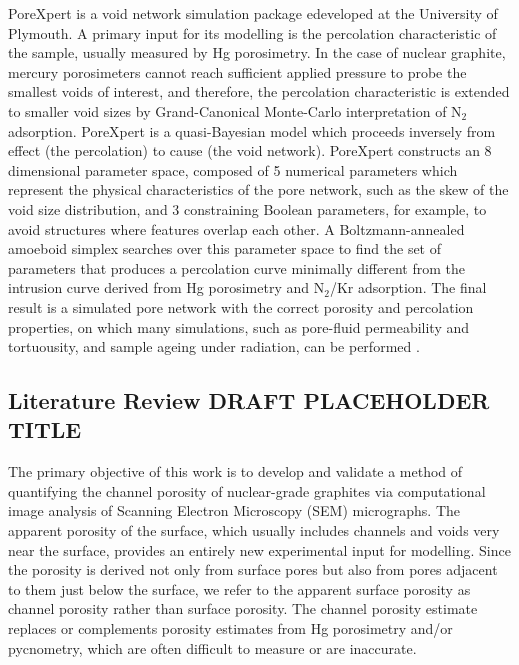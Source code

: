 \documentclass[review]{elsarticle}
\begin{document}
PoreXpert is a void network simulation package edeveloped at the University of
Plymouth. A primary input for its modelling is the percolation characteristic of
the sample, usually measured by Hg porosimetry.  In the case of nuclear
graphite, mercury porosimeters cannot reach sufficient applied pressure to probe
the smallest voids of interest, and therefore, the percolation characteristic is
extended to smaller void sizes by Grand-Canonical Monte-Carlo interpretation of
N$_2$ adsorption.  PoreXpert is a quasi-Bayesian model which proceeds inversely
from effect (the percolation) to cause (the void network). PoreXpert constructs
an 8 dimensional parameter space,  composed of 5 numerical parameters which
represent the physical characteristics of the pore network, such as the skew of
the void size distribution, and 3 constraining Boolean parameters, for example,
to avoid structures where features overlap each other. A Boltzmann-annealed
amoeboid simplex searches over this parameter space to find the set of
parameters that produces a percolation curve minimally different from the
intrusion curve derived from Hg porosimetry and N$_2$/Kr adsorption. The final
result is a simulated pore network with the correct porosity and percolation
properties, on which many simulations, such as pore-fluid permeability and
tortuousity, and sample ageing under radiation, can be performed
\citep{MatthewsPoreXpert2025}.

\subsection{Literature Review DRAFT PLACEHOLDER TITLE}

The primary objective of this work is to develop and validate a method of
quantifying the channel porosity of nuclear-grade graphites via computational
image analysis of Scanning Electron Microscopy (SEM) micrographs. The apparent
porosity of the surface, which usually includes channels and voids very near the
surface, provides an entirely new experimental input for modelling.  Since the
porosity is derived not only from surface pores but also from pores adjacent to
them just below the surface, we refer to the apparent surface porosity as
channel porosity rather than surface porosity. The channel porosity estimate
replaces or complements porosity estimates from Hg porosimetry and/or
pycnometry, which are often difficult to measure or are inaccurate. 
\end{document}
